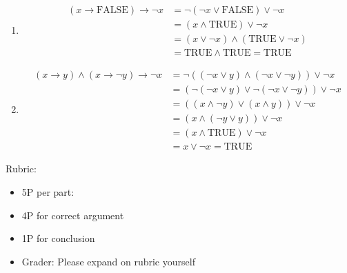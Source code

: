 \documentclass{article}
\theoremstyle{definition}
\begin{document}
\begin{solution}
\begin{enumerate}
        \item
        \begin{align*}
            (x \rightarrow \mathrm{FALSE}) \rightarrow \neg x
            &=\neg(\neg x \vee \mathrm{FALSE}) \vee \neg x
          \\&=(x \wedge \mathrm{TRUE}) \vee \neg x 
          \\&=(x \vee \neg x)\wedge(\mathrm{TRUE} \vee \neg x) 
          \\&= \mathrm{TRUE} \wedge \mathrm{TRUE} = \mathrm{TRUE}
        \end{align*}
        \item
        \begin{align*}
            (x \rightarrow y) \wedge (x \rightarrow \neg y) \rightarrow \neg x
            &= \neg((\neg x \vee y) \wedge (\neg x \vee \neg y)) \vee \neg x
          \\&= (\neg(\neg x \vee y) \vee \neg(\neg x \vee \neg y)) \vee \neg x
          \\&= ((x \wedge \neg y) \vee (x \wedge y)) \vee \neg x
          \\&= (x \wedge (\neg y \vee y))\vee \neg x
          \\&= (x \wedge \mathrm{TRUE}) \vee \neg x
          \\&= x \vee \neg x = \mathrm{TRUE}
        \end{align*}
    \end{enumerate}
{\color{red} Rubric:
\begin{itemize}
\item 5P per part: 
\item 4P for correct argument
\item 1P for conclusion
\item Grader: Please expand on rubric yourself
\end{itemize}}
\end{solution}
\end{document}
